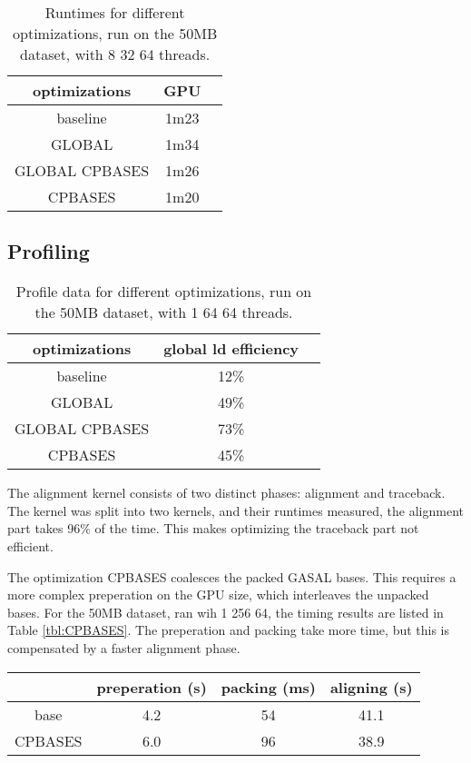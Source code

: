 \documentclass[../main/thesis.tex]{subfiles}
\begin{document}


\begin{table}
\centering
\caption{Runtimes for different optimizations, run on the 50MB dataset, with 8 32 64 threads.}
\label{tbl:darwin2}
\begin{tabular}{c c c}
optimizations & GPU \\ \hline
baseline & 1m23 \\
GLOBAL & 1m34 \\
GLOBAL CPBASES & 1m26 \\
CPBASES & 1m20 \\
\end{tabular}
\end{table}



\subsection{Profiling}

\begin{table}
\centering
\caption{Profile data for different optimizations, run on the 50MB dataset, with 1 64 64 threads.}
\label{tbl:darwin2}
\begin{tabular}{c c c}
optimizations & global ld efficiency \\ \hline
baseline & 12\% \\
GLOBAL & 49\% \\
GLOBAL CPBASES & 73\% \\
CPBASES & 45\% \\
\end{tabular}
\end{table}


The alignment kernel consists of two distinct phases: alignment and traceback.
The kernel was split into two kernels, and their runtimes measured, the alignment part takes 96\% of the time.
This makes optimizing the traceback part not efficient.


The optimization CPBASES coalesces the packed GASAL bases.
This requires a more complex preperation on the GPU size, which interleaves the unpacked bases.
For the 50MB dataset, ran wih 1 256 64, the timing results are listed in Table \ref{tbl:CPBASES}.
The preperation and packing take more time, but this is compensated by a faster alignment phase.

\begin{table}
\centering
\begin{tabular}{c c c c}
& preperation (s) & packing (ms) & aligning (s) \\ \hline
base & 4.2 & 54 & 41.1 \\
CPBASES & 6.0 & 96 & 38.9 \\
\end{tabular}
\end{table}
\end{document}
